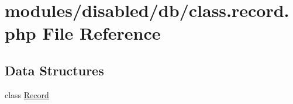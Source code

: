 \hypertarget{class_8record_8php}{\section{modules/disabled/db/class.record.\-php File Reference}
\label{class_8record_8php}
}
\subsection*{Data Structures}
\begin{DoxyCompactItemize}
\item 
class \hyperlink{class_record}{Record}
\end{DoxyCompactItemize}
